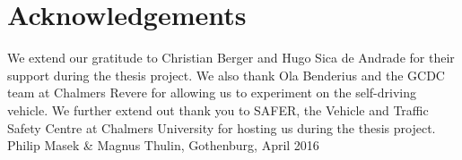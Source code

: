 \thispagestyle{plain}			%
\section*{Acknowledgements}
We extend our gratitude to Christian Berger and Hugo Sica de Andrade for their support during the thesis project. We also thank Ola Benderius and the GCDC team at Chalmers Revere for allowing us to experiment on the self-driving vehicle. We further extend out thank you to SAFER, the Vehicle and Traffic Safety Centre at Chalmers University for hosting us during the thesis project. \newline \newline \newline
\vspace{1.5cm}
\hfill
Philip Masek \& Magnus Thulin, Gothenburg, April 2016 \\

\newpage				%
\thispagestyle{empty}
\mbox{}